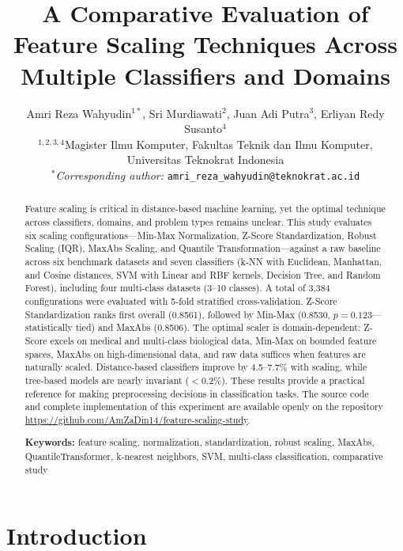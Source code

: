 \documentclass[12pt,a4paper]{article}
\title{\Large\textbf{A Comparative Evaluation of\\[4pt] Feature Scaling Techniques
       Across Multiple Classifiers and Domains}}
\author{
  Amri Reza Wahyudin$^{1*}$, Sri Murdiawati$^{2}$, Juan Adi Putra$^{3}$, Erliyan Redy Susanto$^{4}$ \\[4pt]
  \normalsize
  $^{1,2,3,4}$Magister Ilmu Komputer, Fakultas Teknik dan Ilmu Komputer,\\
  \normalsize
  Universitas Teknokrat Indonesia \\[4pt]
  \normalsize
  $^{*}$\textit{Corresponding author:} \texttt{amri\_reza\_wahyudin@teknokrat.ac.id}
}
\date{}
\begin{document}

\hfuzz=30pt  %
\maketitle
{}

\begin{abstract}
\noindent
Feature scaling is critical in distance-based machine learning, yet the optimal technique across classifiers, domains, and problem types remains unclear. This study evaluates six scaling configurations---Min-Max Normalization, Z-Score Standardization, Robust Scaling (IQR), MaxAbs Scaling, and Quantile Transformation---against a raw baseline across six benchmark datasets and seven classifiers (k-NN with Euclidean, Manhattan, and Cosine distances, SVM with Linear and RBF kernels, Decision Tree, and Random Forest), including four multi-class datasets (3--10 classes). A total of 3,384 configurations were evaluated with 5-fold stratified cross-validation. Z-Score Standardization ranks first overall (0.8561), followed by Min-Max (0.8530, $p=0.123$---statistically tied) and MaxAbs (0.8506). The optimal scaler is domain-dependent: Z-Score excels on medical and multi-class biological data, Min-Max on bounded feature spaces, MaxAbs on high-dimensional data, and raw data suffices when features are naturally scaled. Distance-based classifiers improve by 4.5--7.7\% with scaling, while tree-based models are nearly invariant ($<$0.2\%). These results provide a practical reference for making preprocessing decisions in classification tasks. The source code and complete implementation of this experiment are available openly on the repository \url{https://github.com/AmZaDin14/feature-scaling-study}.

\vspace{6pt}
\noindent\textbf{Keywords:} feature scaling, normalization, standardization, robust scaling, MaxAbs, QuantileTransformer, k-nearest neighbors, SVM, multi-class classification, comparative study
\end{abstract}

\section{Introduction}
\label{sec:intro}
\end{document}
